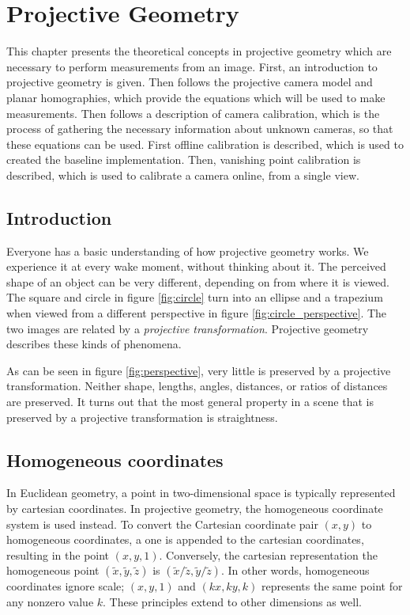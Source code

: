 \chapter{Projective Geometry} \label{chapter:projective_geometry}
This chapter presents the theoretical concepts in projective geometry which are necessary to perform measurements from an image.
First, an introduction to projective geometry is given.
Then follows the projective camera model and planar homographies, which provide the equations which will be used to make measurements.
Then follows a description of camera calibration, which is the process of gathering the necessary information about unknown cameras, so that these equations can be used. 
First offline calibration is described, which is used to created the baseline implementation.
Then, vanishing point calibration is described, which is used to calibrate a camera online, from a single view.

\section{Introduction}
Everyone has a basic understanding of how projective geometry works.
We experience it at every wake moment, without thinking about it. 
The perceived shape of an object can be very different, depending on from where it is viewed.
The square and circle in figure \ref{fig:circle} turn into an ellipse and a trapezium when viewed from a different perspective in figure \ref{fig:circle_perspective}.
The two images are related by a \textit{projective transformation}.
Projective geometry describes these kinds of phenomena.



As can be seen in figure \ref{fig:perspective}, very little is preserved by a projective transformation.
Neither shape, lengths, angles, distances, or ratios of distances are preserved.
It turns out that the most general property in a scene that is preserved by a projective transformation is straightness. \cite[p. 1]{hartley-zisserman}

\section{Homogeneous coordinates}

In Euclidean geometry, a point in two-dimensional space is typically represented by cartesian coordinates.
In projective geometry, the homogeneous coordinate system is used instead.
To convert the Cartesian coordinate pair $(x,y)$ to homogeneous coordinates, a one is appended to the cartesian coordinates, resulting in the point $(x,y,1)$. 
Conversely, the cartesian representation the homogeneous point $(\tilde{x},\tilde{y},\tilde{z})$ is $(\tilde{x}/\tilde{z},\tilde{y}/\tilde{z})$. 
In other words, homogeneous coordinates ignore scale; $(x,y,1)$ and $(kx,ky,k)$ represents the same point for any nonzero value $k$.
These principles extend to other dimensions as well. \cite[p. 2]{hartley-zisserman}

